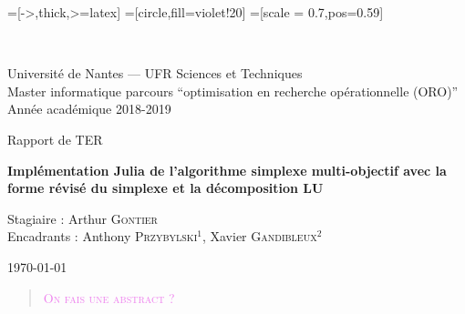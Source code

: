 \documentclass[a4paper,10pt]{article}
\newcommand{\arthur}[1]{\textcolor{violet}{\textsc{#1}}}
\theoremstyle{plain}
\begin{document}
\lstset{language=julia}

=[->,thick,>=latex]
=[circle,fill=violet!20]
=[scale = 0.7,pos=0.59]


~
\vspace{50mm}
       {\large
         \begin{center}
           Université de Nantes --- UFR Sciences et Techniques\\
           Master informatique parcours ``optimisation en recherche opérationnelle (ORO)''\\
           Année académique 2018-2019
           \vspace{30mm}
           
           { \LARGE
             
             Rapport de TER\\
             \vspace{5mm}
             
             {\huge \textbf{Implémentation Julia de l'algorithme simplexe multi-objectif avec la forme révisé du simplexe et la décomposition LU}}
             \vspace{5mm}
             
             Stagiaire : Arthur \textsc{Gontier} \\
             Encadrants : Anthony \textsc{Przybylski}$^1$, Xavier \textsc{Gandibleux}$^2$
             \vspace{50mm}
             
             \today
           }  
         \end{center}
       }

\begin{abstract}
  \arthur{On fais une abstract ?}
\end{abstract}

\vfill
\break

\tableofcontents

\vfill
\break
\end{document}
